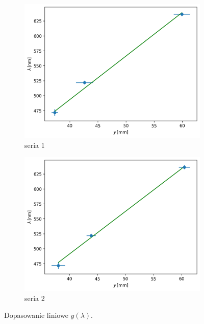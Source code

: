\documentclass[12pt]{article}
\begin{document}
\begin{figure}[H]
  \centering
  \begin{subfigure}{0.45\textwidth}
    \includegraphics[width=\linewidth]{line_fit_wavelength_0}
    \caption{seria 1}
    \label{fig:line_fit_wavelength_1}
  \end{subfigure}\hfill
  \begin{subfigure}{0.45\textwidth}
    \includegraphics[width=\linewidth]{line_fit_wavelength_1}
    \caption{seria 2}
    \label{fig:line_fit_wavelength_2}
  \end{subfigure}
  \caption{Dopasowanie liniowe \(y(\lambda)\).}
  \label{fig:line_fit_wavelength}
\end{figure}
\end{document}
